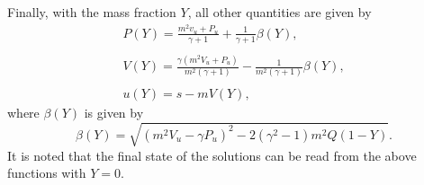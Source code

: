 \documentclass[preprint,12pt]{elsarticle}
\begin{document}
Finally, with the mass fraction $Y$, all other quantities are given by
\begin{equation}\label{derived Quantities}
  \begin{array}{l}
    P(Y) = \displaystyle\frac{m^2v_u + P_u}{\gamma + 1} + \frac{1}{\gamma + 1}\beta(Y),\\
    \\
    V(Y) = \displaystyle\frac{\gamma(m^2V_u + P_u)}{m^2(\gamma + 1)} - \frac{1}{m^2(\gamma + 1)}\beta(Y),\\
    \\
    u(Y) = s - mV(Y),
  \end{array}
\end{equation}
where $\beta(Y)$ is given by
\begin{equation}
  \beta(Y) = \sqrt{(m^2V_u - \gamma P_u)^2 - 2(\gamma^2 - 1)m^2Q(1 - Y)}.
\end{equation}
It is noted that the final state of the solutions can be read from the above
functions with $Y=0$.
\end{document}

